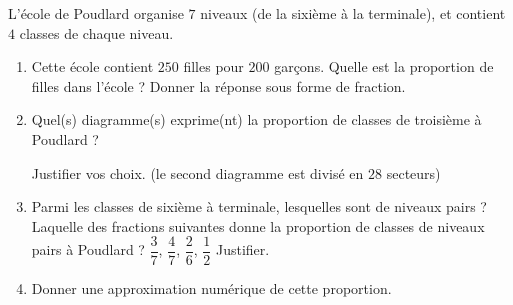 
\begin{exercice}\label{exosmath-0888}

    L'école de Poudlard organise \( 7\) niveaux (de la sixième à la terminale), et contient \( 4\) classes de chaque niveau. 
    
    \begin{enumerate}
        \item
            Cette école contient \( 250\) filles pour \( 200\) garçons. Quelle est la proportion de filles dans l'école ? Donner la réponse sous forme de fraction.
        \item
            
    Quel(s) diagramme(s) exprime(nt) la proportion de classes de troisième à Poudlard ?

\begin{center}
   
   
   
\end{center}
Justifier vos choix. (le second diagramme est divisé en \( 28\) secteurs)
\item
    Parmi les classes de sixième à terminale, lesquelles sont de niveaux pairs ? Laquelle des fractions suivantes donne la proportion de classes de niveaux pairs à Poudlard ?  \( \dfrac{ 3 }{ 7 }\), \( \dfrac{ 4 }{ 7 }\), \( \dfrac{ 2 }{ 6 }\), \( \dfrac{ 1 }{ 2 }\) Justifier.

\item
    Donner une approximation numérique de cette proportion.
    \end{enumerate}

\end{exercice}
